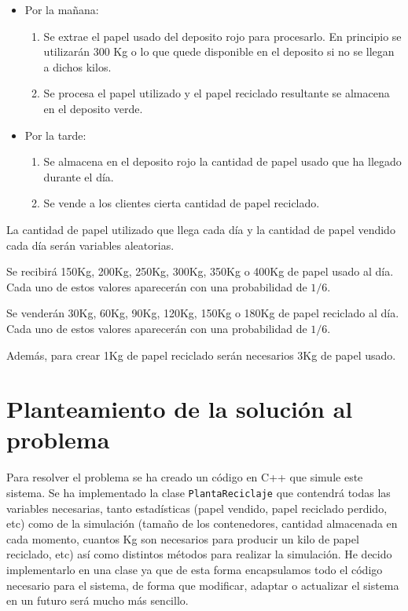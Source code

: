 \documentclass[12pt, spanish]{article}
\begin{document}
\begin{itemize}
	\item Por la mañana:
		\begin{enumerate}
			\item Se extrae el papel usado del deposito rojo para procesarlo. En principio se utilizarán 300 Kg o lo que quede disponible en el deposito si no se llegan a dichos kilos.
			\item Se procesa el papel utilizado y el papel reciclado resultante se almacena en el deposito verde.
		\end{enumerate}

	\item Por la tarde:
		\begin{enumerate}
			\item Se almacena en el deposito rojo la cantidad de papel usado que ha llegado durante el día.
			\item Se vende a los clientes cierta cantidad de papel reciclado.
		\end{enumerate}
\end{itemize}

La cantidad de papel utilizado que llega cada día y la cantidad de papel vendido cada día serán variables aleatorias.

Se recibirá 150Kg, 200Kg, 250Kg, 300Kg, 350Kg o 400Kg de papel usado al día. Cada uno de estos valores aparecerán con una probabilidad de $1/6$.

Se venderán 30Kg, 60Kg, 90Kg, 120Kg, 150Kg o 180Kg de papel reciclado al día. Cada uno de estos valores aparecerán con una probabilidad de $1/6$.

Además, para crear 1Kg de papel reciclado serán necesarios 3Kg de papel usado.

\section{Planteamiento de la solución al problema}

Para resolver el problema se ha creado un código en C++ que simule este sistema. Se ha implementado la clase \texttt{PlantaReciclaje} que contendrá todas las variables necesarias, tanto estadísticas (papel vendido, papel reciclado perdido, etc) como de la simulación (tamaño de los contenedores, cantidad almacenada en cada momento, cuantos Kg son necesarios para producir un kilo de papel reciclado, etc) así como distintos métodos para realizar la simulación. He decido implementarlo en una clase ya que de esta forma encapsulamos todo el código necesario para el sistema, de forma que modificar, adaptar o actualizar el sistema en un futuro será mucho más sencillo.
\end{document}
